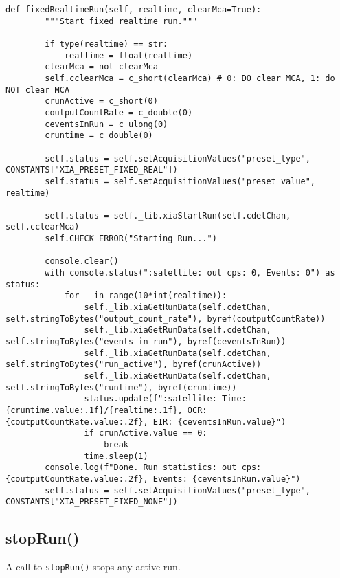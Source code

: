             \begin{lstlisting}[style=mypython, firstnumber=224, caption={[XMagix method fixedRealtimeRun()]XMagix method fixedRealtimeRun().}, label={lst:xmagix fixedRealtimeRun}]
    def fixedRealtimeRun(self, realtime, clearMca=True):
        """Start fixed realtime run."""

        if type(realtime) == str:
            realtime = float(realtime)
        clearMca = not clearMca
        self.cclearMca = c_short(clearMca) # 0: DO clear MCA, 1: do NOT clear MCA
        crunActive = c_short(0)
        coutputCountRate = c_double(0)
        ceventsInRun = c_ulong(0)
        cruntime = c_double(0)

        self.status = self.setAcquisitionValues("preset_type", CONSTANTS["XIA_PRESET_FIXED_REAL"])
        self.status = self.setAcquisitionValues("preset_value", realtime)

        self.status = self._lib.xiaStartRun(self.cdetChan, self.cclearMca)
        self.CHECK_ERROR("Starting Run...")

        console.clear()
        with console.status(":satellite: out cps: 0, Events: 0") as status:
            for _ in range(10*int(realtime)):
                self._lib.xiaGetRunData(self.cdetChan, self.stringToBytes("output_count_rate"), byref(coutputCountRate))
                self._lib.xiaGetRunData(self.cdetChan, self.stringToBytes("events_in_run"), byref(ceventsInRun))
                self._lib.xiaGetRunData(self.cdetChan, self.stringToBytes("run_active"), byref(crunActive))
                self._lib.xiaGetRunData(self.cdetChan, self.stringToBytes("runtime"), byref(cruntime))
                status.update(f":satellite: Time: {cruntime.value:.1f}/{realtime:.1f}, OCR: {coutputCountRate.value:.2f}, EIR: {ceventsInRun.value}")
                if crunActive.value == 0:
                    break
                time.sleep(1)
        console.log(f"Done. Run statistics: out cps: {coutputCountRate.value:.2f}, Events: {ceventsInRun.value}")
        self.status = self.setAcquisitionValues("preset_type", CONSTANTS["XIA_PRESET_FIXED_NONE"])
            \end{lstlisting}

        \subsection{stopRun()}\label{sec:stopRun}
            A call to \texttt{stopRun()} stops any active run.\par\medskip

